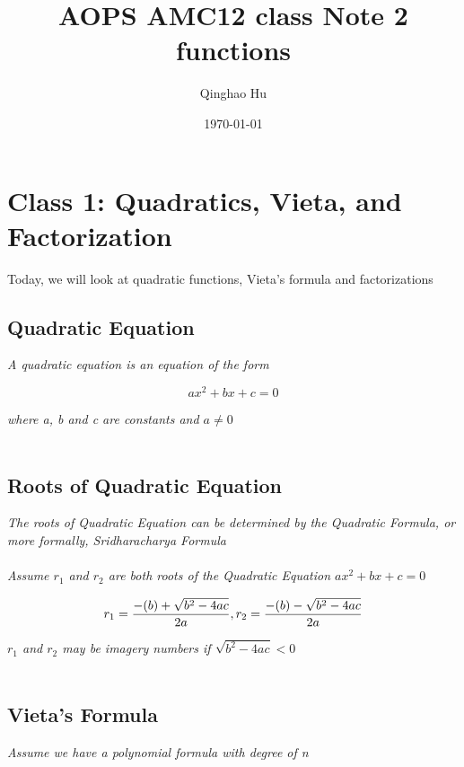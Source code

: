 \documentclass[10pt]{article}
\title{\textbf{AOPS AMC12 class Note 2} \\ \large functions}
\author{Qinghao Hu}
\date{\today}
\theoremstyle{remark}
\begin{document}
\maketitle
\newpage
\tableofcontents
\newpage

\section{Class 1: Quadratics, Vieta, and Factorization}
Today, we will look at quadratic functions, Vieta's formula and factorizations

\subsection{Quadratic Equation}

\textit{A quadratic equation is an equation of the form}

\begin{equation}
	ax^2 + bx + c = 0
\end{equation}

\textit{where a, b and c are constants and $a \ne 0$ }
\\\\

\subsection{Roots of Quadratic Equation}

\textit{The roots of Quadratic Equation can be determined by the Quadratic Formula, or more formally, Sridharacharya Formula}
\\
\\
\textit{Assume $r_1$ and $r_2$ are both roots of the Quadratic Equation $ax^2 + bx + c = 0$}

\begin{equation}
	r_1 = {{-(b) + \sqrt{b^2 - 4ac}} \over 2a}, r_2 = {{-(b) - \sqrt{b^2 - 4ac}} \over 2a}
\end{equation}

\textit{$r_1$ and $r_2$ may be imagery numbers if $\sqrt{b^2 - 4 a c} < 0$}
\\\\

\subsection{Vieta's Formula}
\textit{Assume we have a polynomial formula with degree of n}
\end{document}
